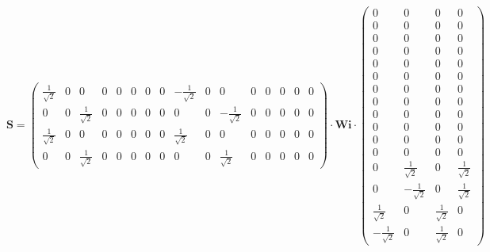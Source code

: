\[ \mathbf{S} = \left(\begin{array}{cccccccccccccccc}
\frac{1}{\sqrt{2}} & 0 & 0 & 0 & 0 & 0 & 0 & 0 & -\frac{1}{\sqrt{2}} &
0 & 0 & 0 & 0 & 0 & 0 & 0 \\ 0 & 0 & \frac{1}{\sqrt{2}} & 0 & 0 & 0 &
0 & 0 & 0 & 0 & -\frac{1}{\sqrt{2}} & 0 & 0 & 0 & 0 & 0 \\
\frac{1}{\sqrt{2}} & 0 & 0 & 0 & 0 & 0 & 0 & 0 & \frac{1}{\sqrt{2}} &
0 & 0 & 0 & 0 & 0 & 0 & 0 \\ 0 & 0 & \frac{1}{\sqrt{2}} & 0 & 0 & 0 &
0 & 0 & 0 & 0 & \frac{1}{\sqrt{2}} & 0 & 0 & 0 & 0 & 0
\end{array}\right) \cdot \mathbf{Wi} \cdot\left(\begin{array}{cccc} 0
& 0 & 0 & 0 \\ 0 & 0 & 0 & 0 \\ 0 & 0 & 0 & 0 \\ 0 & 0 & 0 & 0 \\ 0 &
0 & 0 & 0 \\ 0 & 0 & 0 & 0 \\ 0 & 0 & 0 & 0 \\ 0 & 0 & 0 & 0 \\ 0 & 0
& 0 & 0 \\ 0 & 0 & 0 & 0 \\ 0 & 0 & 0 & 0 \\ 0 & 0 & 0 & 0 \\ 0 &
\frac{1}{\sqrt{2}} & 0 & \frac{1}{\sqrt{2}} \\ 0 & -\frac{1}{\sqrt{2}}
& 0 & \frac{1}{\sqrt{2}} \\ \frac{1}{\sqrt{2}} & 0 &
\frac{1}{\sqrt{2}} & 0 \\ -\frac{1}{\sqrt{2}} & 0 & \frac{1}{\sqrt{2}}
& 0 \end{array}\right) \]
